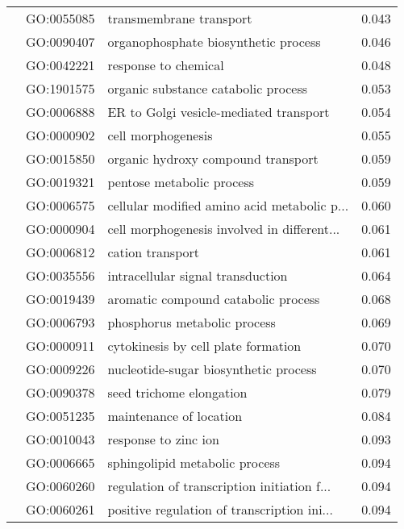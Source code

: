 \begin{longtable}{lllr}
   & GO:0055085 &                      transmembrane transport &         0.043 \\
   & GO:0090407 &         organophosphate biosynthetic process &         0.046 \\
   & GO:0042221 &                         response to chemical &         0.048 \\
   & GO:1901575 &          organic substance catabolic process &         0.053 \\
   & GO:0006888 &       ER to Golgi vesicle-mediated transport &         0.054 \\
   & GO:0000902 &                           cell morphogenesis &         0.055 \\
   & GO:0015850 &           organic hydroxy compound transport &         0.059 \\
   & GO:0019321 &                    pentose metabolic process &         0.059 \\
   & GO:0006575 &  cellular modified amino acid metabolic p... &         0.060 \\
   & GO:0000904 &  cell morphogenesis involved in different... &         0.061 \\
   & GO:0006812 &                             cation transport &         0.061 \\
   & GO:0035556 &            intracellular signal transduction &         0.064 \\
   & GO:0019439 &          aromatic compound catabolic process &         0.068 \\
   & GO:0006793 &                 phosphorus metabolic process &         0.069 \\
   & GO:0000911 &          cytokinesis by cell plate formation &         0.070 \\
   & GO:0009226 &        nucleotide-sugar biosynthetic process &         0.070 \\
   & GO:0090378 &                     seed trichome elongation &         0.079 \\
   & GO:0051235 &                      maintenance of location &         0.084 \\
   & GO:0010043 &                         response to zinc ion &         0.093 \\
   & GO:0006665 &               sphingolipid metabolic process &         0.094 \\
   & GO:0060260 &  regulation of transcription initiation f... &         0.094 \\
   & GO:0060261 &  positive regulation of transcription ini... &         0.094 \\

\end{longtable}
